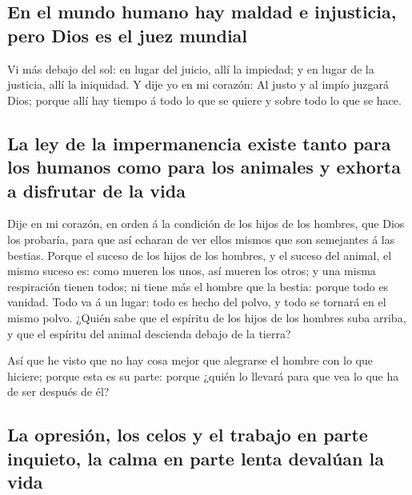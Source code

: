 \hypertarget{en-el-mundo-humano-hay-maldad-e-injusticia-pero-dios-es-el-juez-mundial}{%
\subsection{En el mundo humano hay maldad e injusticia, pero Dios es el
juez
mundial}\label{en-el-mundo-humano-hay-maldad-e-injusticia-pero-dios-es-el-juez-mundial}}

 Vi más debajo del sol: en lugar del juicio, allí la
impiedad; y en lugar de la justicia, allí la iniquidad. 
Y dije yo en mi corazón: Al justo y al impío juzgará Dios; porque allí
hay tiempo á todo lo que se quiere y sobre todo lo que se hace.

\hypertarget{la-ley-de-la-impermanencia-existe-tanto-para-los-humanos-como-para-los-animales-y-exhorta-a-disfrutar-de-la-vida}{%
\subsection{La ley de la impermanencia existe tanto para los humanos
como para los animales y exhorta a disfrutar de la
vida}\label{la-ley-de-la-impermanencia-existe-tanto-para-los-humanos-como-para-los-animales-y-exhorta-a-disfrutar-de-la-vida}}

 Dije en mi corazón, en orden á la condición de los hijos
de los hombres, que Dios los probaría, para que así echaran de ver ellos
mismos que son semejantes á las bestias.  Porque el
suceso de los hijos de los hombres, y el suceso del animal, el mismo
suceso es: como mueren los unos, así mueren los otros; y una misma
respiración tienen todos; ni tiene más el hombre que la bestia: porque
todo es vanidad.  Todo va á un lugar: todo es hecho del
polvo, y todo se tornará en el mismo polvo.  ¿Quién sabe
que el espíritu de los hijos de los hombres suba arriba, y que el
espíritu del animal descienda debajo de la tierra?

 Así que he visto que no hay cosa mejor que alegrarse el
hombre con lo que hiciere; porque esta es su parte: porque ¿quién lo
llevará para que vea lo que ha de ser después de él?

\hypertarget{la-opresiuxf3n-los-celos-y-el-trabajo-en-parte-inquieto-la-calma-en-parte-lenta-devaluxfaan-la-vida}{%
\subsection{La opresión, los celos y el trabajo en parte inquieto, la
calma en parte lenta devalúan la
vida}\label{la-opresiuxf3n-los-celos-y-el-trabajo-en-parte-inquieto-la-calma-en-parte-lenta-devaluxfaan-la-vida}}

